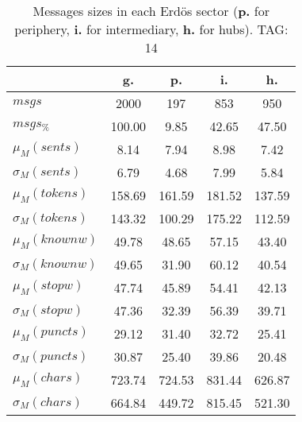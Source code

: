 \begin{table}[h!]
\begin{center}
\begin{tabular}{| l || c | c | c | c |}\hline
 & {\bf g.} & {\bf p.} & {\bf i.} & {\bf h.} \\\hline\hline
$msgs$ & 2000  & 197  & 853  & 950 \\
$msgs_{\%}$ & 100.00  & 9.85  & 42.65  & 47.50 \\\hline
$\mu_M(sents)$ & 8.14  & 7.94  & 8.98  & 7.42 \\
$\sigma_M(sents)$ & 6.79  & 4.68  & 7.99  & 5.84 \\\hline
$\mu_M(tokens)$ & 158.69  & 161.59  & 181.52  & 137.59 \\
$\sigma_M(tokens)$ & 143.32  & 100.29  & 175.22  & 112.59 \\\hline
$\mu_M(knownw)$ & 49.78  & 48.65  & 57.15  & 43.40 \\
$\sigma_M(knownw)$ & 49.65  & 31.90  & 60.12  & 40.54 \\\hline
$\mu_M(stopw)$ & 47.74  & 45.89  & 54.41  & 42.13 \\
$\sigma_M(stopw)$ & 47.36  & 32.39  & 56.39  & 39.71 \\\hline
$\mu_M(puncts)$ & 29.12  & 31.40  & 32.72  & 25.41 \\
$\sigma_M(puncts)$ & 30.87  & 25.40  & 39.86  & 20.48 \\\hline
$\mu_M(chars)$ & 723.74  & 724.53  & 831.44  & 626.87 \\
$\sigma_M(chars)$ & 664.84  & 449.72  & 815.45  & 521.30 \\\hline
\end{tabular}
\caption{Messages sizes in each Erd\"os sector ({{\bf p.}} for periphery, {{\bf i.}} for intermediary, {{\bf h.}} for hubs). TAG: 14}
\end{center}
\end{table}